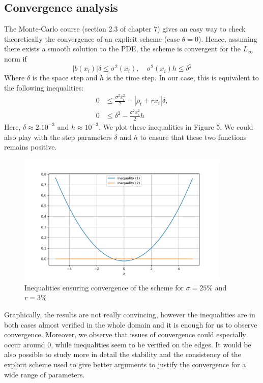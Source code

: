 \documentclass{article}
\begin{document}
\subsection{Convergence analysis}

The Monte-Carlo course (section 2.3 of chapter 7) gives an easy way to check theoretically the convergence of
an explicit scheme (case $\theta=0$). Hence, assuming there exists a smooth solution to the PDE,
the scheme is convergent for the $L_\infty $ norm if
\[
    |b(x_i)|\delta\leqslant \sigma^{2}(x_i), \quad
    \sigma^{2}(x_i)h\leqslant \delta^{2}
\]
Where $\delta$ is the space step and $h$ is the time step.
In our case, this is equivalent to the following inequalities:
\begin{align*}
        0 &\leqslant \frac{\sigma^{2}x_i^{2}}{2}-|\rho_t+rx_i|\delta, \\
        0 &\leqslant \delta^{2}- \frac{\sigma^{2}x_i^{2}}{2}h
\end{align*}
Here, $\delta \approx 2.10^{-3}$ and $h \approx 10^{-3}$. We plot these inequalities in Figure 5. 
We could also play with the step parameters $\delta$ and $h$ to ensure that these two functions remains positive.

\begin{figure}[h]
  \centering
  \includegraphics[width=0.9\textwidth]{charts/Ineq.png}
  \caption{Inequalities ensuring convergence of the scheme for $\sigma = 25\%$ and $r = 3\%$}
\end{figure}

Graphically, the results are not really convincing, however the inequalities are in both
cases almost verified in the whole domain and it is enough for us to observe convergence.
Moreover, we observe that issues of convergence could especially occur around 0,
while inequalities seem to be verified on the edges.
It would be also possible to study more in detail the stability and the consistency
of the explicit scheme used to give better arguments to justify the convergence for a wide range of  parameters.
\end{document}
